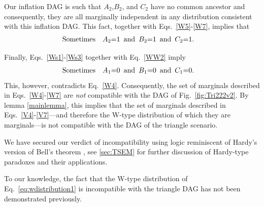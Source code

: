 Our inflation DAG is such that $A_2$,$B_2$, and $C_2$ have no common ancestor and consequently, they are all marginally independent in any distribution consistent with this inflation DAG.  This fact, together with Eqs.~\eqref{W5}-\eqref{W7}, implies that %
\begin{align} \label{WW2}
\text{Sometimes} \quad &A_2 \mathord{=} 1\,\text{ and }\, B_2 \mathord{=} 1\,\text{ and }\, C_2 \mathord{=} 1.
\end{align} 

Finally, Eqs.~\eqref{Ws1}-\eqref{Ws3} together with Eq.~\eqref{WW2} imply
\begin{align} \label{WW3}
\text{Sometimes} \quad &A_1 \mathord{=} 0\,\text{ and }\, B_1 \mathord{=} 0\,\text{ and }\, C_1 \mathord{=} 0.
\end{align}
This, however, contradicts Eq.~\eqref{W4}.  Consequently, the set of marginals described in Eqs.~\eqref{W4}-\eqref{W7} are \emph{not} compatible with the DAG of Fig.~\ref{fig:Tri222v2}.  By lemma \ref{mainlemma}, this implies that the set of marginals described in Eqs.~\eqref{V4}-\eqref{V7}---and therefore the W-type distribution of which they are marginals---is not compatible with the DAG of the triangle scenario.

We have secured our verdict of incompatibility using logic reminiscent of  Hardy's version of Bell's theorem \cite{L.Hardy:PRL:1665,Mansfield2012}, see \cref{sec:TSEM} for further discussion of Hardy-type paradoxes and their applications.

To our knowledge, the fact that the W-type distribution of Eq.~\eqref{eq:wdistribution1} is incompatible with the triangle DAG has not been demonstrated previously.


